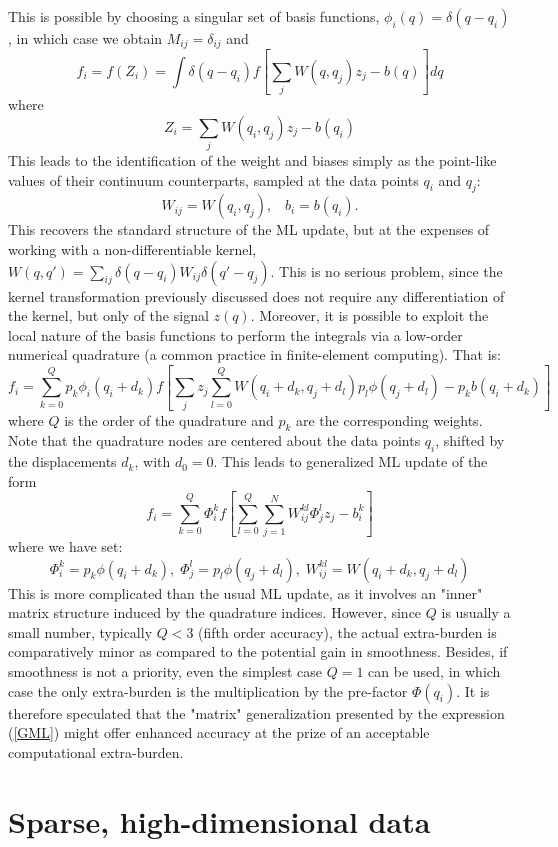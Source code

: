 \documentclass[15pt]{article}
\begin{document}
This is possible by choosing a singular set of basis functions, 
$\phi_i(q) = \delta(q-q_i)$, in which case we obtain $M_{ij}=\delta_{ij}$ and 
$$
f_i = f(Z_i) = \int \delta(q-q_i) f[\sum_j W(q,q_j)z_j - b(q)] dq
$$
where
$$
Z_i = \sum_j W(q_i,q_j)z_j - b(q_i)
$$
This leads to the identification of the weight and biases simply as the
point-like values of their continuum counterparts, sampled at the data points 
$q_i$ and $q_j$:
$$
W_{ij} = W(q_i,q_j), \;\;\; b_i = b(q_i).
$$
This recovers the standard structure of the ML update, but at the 
expenses of working with a non-differentiable kernel, 
$W(q,q')=\sum_{ij} \delta(q-q_i) W_{ij} \delta (q'-q_j)$.
This is no serious problem, since the kernel transformation previously discussed
does not require any differentiation of the kernel, but only of the signal $z(q)$.
Moreover, it is possible to exploit the local nature of the 
basis functions to perform the integrals via a low-order numerical quadrature 
(a common practice in finite-element computing).
That is:
\begin{equation}
\label{FI2}
f_i = \sum_{k=0}^Q p_{k} \phi_i(q_i+d_k) 
f[\sum_j z_j \sum_{l=0}^Q  W(q_i+d_k,q_j+d_l) p_l \phi(q_j+d_l) - p_k b(q_i+d_k)]
\end{equation}
where $Q$ is the order of the quadrature and $p_k$ are the corresponding weights.
Note that the quadrature nodes are centered about the data points $q_i$, shifted
by the displacements $d_k$, with $d_0=0$. 
This leads to generalized ML update of the form
\begin{equation}
\label{GML}
f_i = \sum_{k=0}^Q \Phi_i^k f[\sum_{l=0}^Q \sum_{j=1}^N W_{ij}^{kl}\Phi_{j}^l z_j - b_{i}^k] 
\end{equation}
where we have set:
$$
\Phi_i^k     = p_k \phi(q_i+d_k),\;
\Phi_j^l     = p_l \phi(q_j+d_l),\;
W_{ij}^{kl}  = W(q_i+d_k,q_j+d_l)
$$
This is more complicated than the usual ML update, as it involves an "inner" 
matrix structure induced by the quadrature indices.
However, since $Q$ is usually a small number, typically $Q<3$ (fifth order accuracy), the actual 
extra-burden is comparatively minor as compared to the potential gain in smoothness. 
Besides, if smoothness is not a priority, even the simplest case $Q=1$ can be used, in 
which case the only  extra-burden is the multiplication by 
the pre-factor $\Phi(q_i)$.
It is therefore speculated that the "matrix" generalization presented by the expression
(\ref{GML}) might offer enhanced accuracy at the prize of an acceptable computational extra-burden.

\section{Sparse, high-dimensional data}
\end{document}
